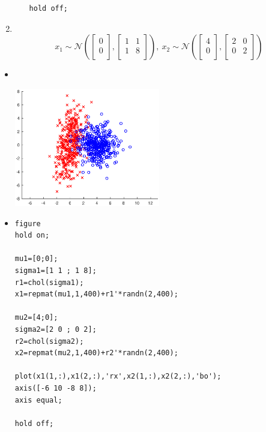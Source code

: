 \documentclass[letterpaper,11pt]{article}
\begin{document}
\begin{enumerate}
\begin{itemize}
\begin{verbatim}
hold off;
\end{verbatim}
\end{itemize}

\newpage

\item ~\\
\begin{equation}
\nonumber
x_1 \sim \mathcal{N} \left(\left[\begin{array}{c}
0 \\
0 \\
\end{array}\right], \left[\begin{array}{cc}
1 & 1 \\
1 & 8 \\
\end{array}\right] \right),~
x_2 \sim \mathcal{N} \left(\left[\begin{array}{c}
4 \\
0 \\
\end{array}\right], \left[\begin{array}{cc}
2 & 0 \\
0 & 2 \\
\end{array}\right]\right)
\end{equation}
\end{enumerate}

\begin{itemize}
\item ~\\
\begin{center}
\includegraphics[width=0.5\textwidth]{./matlab/hw1_7_2.eps}
\end{center}
\item
\begin{verbatim}
figure
hold on;

mu1=[0;0];
sigma1=[1 1 ; 1 8];
r1=chol(sigma1);
x1=repmat(mu1,1,400)+r1'*randn(2,400);

mu2=[4;0];
sigma2=[2 0 ; 0 2];
r2=chol(sigma2);
x2=repmat(mu2,1,400)+r2'*randn(2,400);

plot(x1(1,:),x1(2,:),'rx',x2(1,:),x2(2,:),'bo');
axis([-6 10 -8 8]);
axis equal;

hold off;
\end{verbatim}
\end{itemize}
\end{document}
